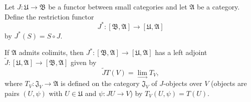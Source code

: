 Let $J: \mathfrak{U} \rightarrow \mathfrak{B}$ be a functor between small categories and let $\mathfrak{A}$ be a category. Define the restriction functor
$$J^* : [\mathfrak{B}, \mathfrak{A}] \rightarrow [\mathfrak{U}, \mathfrak{A}]$$
by $J^*(S) = S \circ J$.

If $\mathfrak{A}$ admits colimits, then $J^* : [\mathfrak{B}, \mathfrak{A}] \rightarrow [\mathfrak{U}, \mathfrak{A}]$ has a left adjoint $\tilde{J} : [\mathfrak{U}, \mathfrak{A}] \rightarrow [\mathfrak{B}, \mathfrak{A}]$ given by
$$\tilde{J} T(V) = \lim_{\longrightarrow} T_V,$$
where $T_V : \mathfrak{J}_V \rightarrow \mathfrak{A}$ is defined on the category $\mathfrak{J}_V$ of $J$-objects over $V$ (objects are pairs $(U, \psi)$ with $U \in \mathfrak{U}$ and $\psi: JU \rightarrow V$) by $T_V(U, \psi) = T(U)$.
